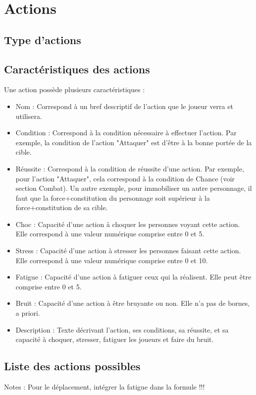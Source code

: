 \section{Actions}
\subsection{Type d'actions}
\subsection{Caractéristiques des actions}
Une action possède plusieurs caractéristiques :
\begin{itemize}
  \item Nom : Correspond à un bref descriptif de l'action que le joueur verra et utilisera.
  \item Condition : Correspond à la condition nécessaire à effectuer l'action. Par exemple, la condition de l'action "Attaquer" est d'être à la bonne portée de la cible.
  \item Réussite : Correspond à la condition de réussite d'une action. Par exemple, pour l'action "Attaquer", cela correspond à la condition de Chance (voir section Combat). Un autre exemple, pour immobiliser un autre personnage, il faut que la force+constitution du personnage soit supérieur à la force+constitution de sa cible.
  \item Choc : Capacité d'une action à choquer les personnes voyant cette action. Elle correspond à une valeur numérique comprise entre 0 et 5.
  \item Stress : Capacité d'une action à stresser les personnes faisant cette action. Elle correspond à une valeur numérique comprise entre 0 et 10.
  \item Fatigue : Capacité d'une action à fatiguer ceux qui la réalisent. Elle peut être comprise entre 0 et 5.
  \item Bruit : Capacité d'une action à être bruyante ou non. Elle n'a pas de bornes, a priori.
  \item Description : Texte décrivant l'action, ses conditions, sa réussite, et sa capacité à choquer, stresser, fatiguer les joueurs et faire du bruit.
\end{itemize}
\subsection{Liste des actions possibles}

Notes : Pour le déplacement, intégrer la fatigue dans la formule !!!
